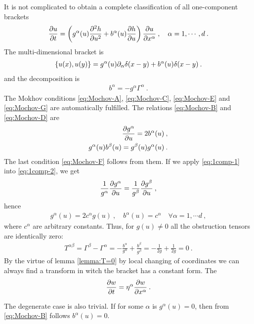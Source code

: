 \begin{example}
    

It is not complicated to obtain a complete classification of all one-component brackets
\begin{align}
    \frac{\partial u}{\partial t} = \left( g^{\alpha}(u) \frac{\partial ^2h}{\partial u^2} + b^{\alpha}(u) \frac{\partial h}{\partial u} \right) \frac{\partial u}{\partial x^\alpha} \:, \quad \alpha = 1, \cdots, d \:.
\end{align}
The multi-dimensional bracket is 
\begin{align}
    \left \lbrace u(x),u(y) \right \rbrace = g^{\alpha}(u) \partial_\alpha \delta(x-y) + b^\alpha(u) \delta(x-y) \:.
\end{align}
and the decomposition is
\begin{align}
    b^\alpha = - g^\alpha \Gamma^\alpha \:.
\end{align}
The Mokhov conditions \eqref{eq:Mochov-A}, \eqref{eq:Mochov-C}, \eqref{eq:Mochov-E} and \eqref{eq:Mochov-G} are automatically fulfilled. The relations \eqref{eq:Mochov-B} and \eqref{eq:Mochov-D} are
\begin{align}
    \frac{\partial g^\alpha}{\partial u} = 2 b^\alpha(u) \:, \label{eq:1comp-1} \\
    g^\alpha(u) b^\beta(u) = g^\beta(u) g^\alpha(u) \label{eq:1comp-2}\:.
\end{align}
The last condition \eqref{eq:Mochov-F} follows from them. If we apply \eqref{eq:1comp-1} into \eqref{eq:1comp-2}, we get
\begin{align}
    \frac{1}{g^\alpha} \frac{\partial g^\alpha}{\partial u}= \frac{1}{g^\beta}\frac{\partial g^\beta}{\partial u} \:,
\end{align}
hence
\begin{align}
    g^\alpha(u) = 2c^\alpha g(u) \:, \quad b^\alpha(u) = c^\alpha \quad \forall \alpha = 1, \cdots d \:,
\end{align}
where $c^\alpha$ are arbitrary constants.
Thus, for $g(u) \neq 0$ all the obstruction tensors are identically zero:
\begin{align}
    T^{\alpha \beta} = \Gamma^\beta - \Gamma^\alpha = -\frac{b^\alpha}{g^\alpha} + \frac{b^\beta}{g^\beta} = - \frac{1}{2 g} + \frac{1}{2g} = 0 \:.
\end{align}
By the virtue of lemma \vref{lemma:T=0} by local changing of coordinates we can always find a transform in witch the bracket has a constant form. The 
\begin{align}
    \frac{\partial w}{\partial t} = \eta^\alpha \frac{\partial w}{\partial x^\alpha} \:.
\end{align}

The degenerate case is also trivial. If for some $\alpha$ is $g^\alpha(u) = 0$, then from \eqref{eq:Mochov-B} follows $b^\alpha(u) = 0$.

\end{example}


